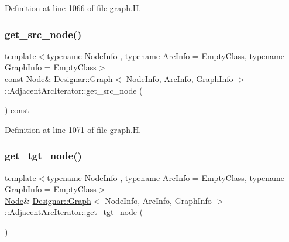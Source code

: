 Definition at line 1066 of file graph.\+H.

\mbox{\label{class_designar_1_1_graph_1_1_adjacent_arc_iterator_ae4ba07319b439cc08df6c957a61bc224}} 
\subsubsection{\texorpdfstring{get\+\_\+src\+\_\+node()}{get\_src\_node()}\hspace{0.1cm}{\footnotesize\ttfamily [2/2]}}
{\footnotesize\ttfamily template$<$typename Node\+Info , typename Arc\+Info  = Empty\+Class, typename Graph\+Info  = Empty\+Class$>$ \\
const \hyperlink{class_designar_1_1_graph_a5dfc7dba9d092ac489c72e40390c37d0}{Node}\& \hyperlink{class_designar_1_1_graph}{Designar\+::\+Graph}$<$ Node\+Info, Arc\+Info, Graph\+Info $>$\+::Adjacent\+Arc\+Iterator\+::get\+\_\+src\+\_\+node (\begin{DoxyParamCaption}{ }\end{DoxyParamCaption}) const\hspace{0.3cm}{\ttfamily [inline]}}



Definition at line 1071 of file graph.\+H.

\mbox{\label{class_designar_1_1_graph_1_1_adjacent_arc_iterator_a400e7399fa39eb49e64afcd2d0b26ff6}} 
\subsubsection{\texorpdfstring{get\+\_\+tgt\+\_\+node()}{get\_tgt\_node()}\hspace{0.1cm}{\footnotesize\ttfamily [1/2]}}
{\footnotesize\ttfamily template$<$typename Node\+Info , typename Arc\+Info  = Empty\+Class, typename Graph\+Info  = Empty\+Class$>$ \\
\hyperlink{class_designar_1_1_graph_a5dfc7dba9d092ac489c72e40390c37d0}{Node}\& \hyperlink{class_designar_1_1_graph}{Designar\+::\+Graph}$<$ Node\+Info, Arc\+Info, Graph\+Info $>$\+::Adjacent\+Arc\+Iterator\+::get\+\_\+tgt\+\_\+node (\begin{DoxyParamCaption}{ }\end{DoxyParamCaption})\hspace{0.3cm}{\ttfamily [inline]}}



